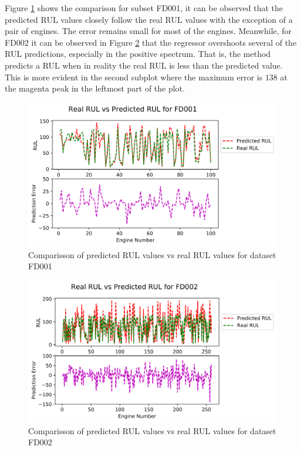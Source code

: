 \documentclass[preprint,12pt]{elsarticle}%
\begin{document}
Figure \ref{Fig:rul_plots_dataset_1} shows the comparison for subset FD001, it can be observed that the predicted RUL values closely follow the real RUL values with the exception of a pair of engines. The error remains small for most of the engines. Meanwhile, for FD002 it can be observed in Figure \ref{Fig:rul_plots_dataset_2} that the regressor overshoots several of the RUL predictions, especially in the positive spectrum. That is, the method predicts a RUL when in reality the real RUL is less than the predicted value. This is more evident in the second subplot where the maximum error is $138$ at the magenta peak in the leftmost part of the plot.

\begin{figure}[!h]
\begin{center}
\includegraphics[scale=0.70]{Figures/rul_plots_dataset_1.png}
\caption{Comparisson of predicted RUL values vs real RUL values for dataset FD001}
\label{Fig:rul_plots_dataset_1}
\end{center}
\end{figure}

\begin{figure}[!h]
\begin{center}
\includegraphics[scale=0.70]{Figures/rul_plots_dataset_2.png}
\caption{Comparisson of predicted RUL values vs real RUL values for dataset FD002}
\label{Fig:rul_plots_dataset_2}
\end{center}
\end{figure}
\end{document}
